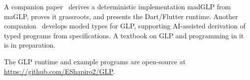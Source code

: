 A companion paper~\cite{shapiro2026implementing} derives a deterministic implementation madGLP from maGLP, proves it grassroots, and presents the Dart/Flutter runtime. Another companion~\cite{shapiro2026types} develops moded types for GLP, supporting AI-assisted derivation of typed programs from specifications. A textbook on GLP and programming in it is in preparation.

The GLP runtime and example programs are open-source at \url{https://github.com/EShapiro2/GLP}.
